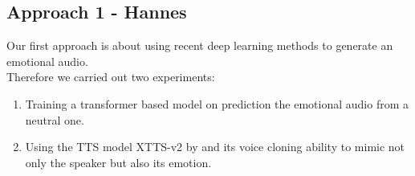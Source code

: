 \documentclass[11pt]{article}
\begin{document}
\subsection{Approach 1 - Hannes}
Our first approach is about using recent deep learning methods to generate an emotional audio. \\
Therefore we carried out two experiments:
\begin{enumerate}
	\item \label{Experiment 1} Training a transformer based model on prediction the emotional audio from a neutral one.
	\item \label{Experiment 2} Using the TTS model XTTS-v2 by \cite{casanova2024xtts} and its voice cloning ability to mimic not only the speaker but also its emotion.
\end{enumerate}
\end{document}
